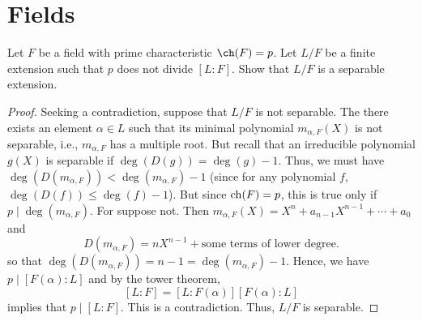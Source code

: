 \section{Fields}
\begin{problem}
Let $F$ be a field with prime characteristic $\ch(F)=p$. Let $L/F$ be a
finite extension such that $p$ does not divide $[L:F]$. Show that $L/F$ is
a separable extension.
\begin{proof}
Seeking a contradiction, suppose that $L/F$ is not separable. The there
exists an element $\alpha\in L$ such that its minimal polynomial
$m_{\alpha,F}(X)$ is not separable, i.e., $m_{\alpha,F}$ has a multiple
root. But recall that an irreducible polynomial $g(X)$ is separable if
$\deg(D(g))=\deg(g)-1$. Thus, we must have
$\deg\left(D(m_{\alpha,F})\right)<\deg\left(m_{\alpha,F}\right)-1$ (since
for any polynomial $f$, $\deg(D(f))\leq \deg(f)-1$). But since $\operatorname{ch}(F)=p$,
this is true only if $p\mid\deg(m_{\alpha,F})$. For suppose not. Then
$m_{\alpha,F}(X)=X^n+a_{n-1}X^{n-1}+\cdots+a_0$ and
\[
D(m_{\alpha,F})=nX^{n-1}+\text{some terms of lower degree.}
\]
so that $\deg(D(m_{\alpha,F}))=n-1=\deg(m_{\alpha,F})-1$. Hence, we have
$p\mid[F(\alpha):L]$ and by the tower theorem,
\[
[L:F]=[L:F(\alpha)][F(\alpha):L]
\]
implies that $p\mid[L:F]$. This is a contradiction. Thus, $L/F$ is
separable.
\end{proof}
\end{problem}

